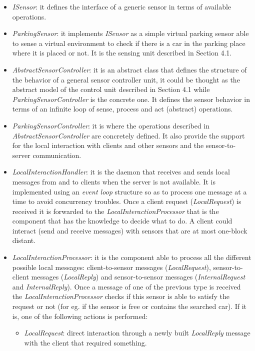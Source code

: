 \documentclass[11pt]{article}
\begin{document}
\begin{itemize}
\item \emph{ISensor}: it defines the interface of a generic sensor in terms of available operations.
\item \emph{ParkingSensor}: it implements \emph{ISensor} as a simple virtual parking sensor able to sense a virtual environment to check if there is a car in the parking place where it is placed or not. It is the sensing unit described in Section 4.1.
\item \emph{AbstractSensorController}: it is an abstract class that defines the structure of the behavior of a general sensor controller unit, it could be thought as the abstract model of the control unit described in Section 4.1 while \emph{ParkingSensorController} is the concrete one. It defines the sensor behavior in terms of an infinite loop of sense, process and act (abstract) operations.
\item \emph{ParkingSensorController}: it is where the operations described in \emph{AbstractSensorController} are concretely defined. It also provide the support for the local interaction with clients and other sensors and the sensor-to-server communication.
\item \emph{LocalInteractionHandler}: it is the daemon that receives and sends local messages from and to clients when the server is not available. It is implemented using an \emph{event loop} structure so as to process one message at a time to avoid concurrency troubles. Once a client request (\emph{LocalRequest}) is received it is forwarded to the \emph{LocalInteractionProcessor} that is the component that has the knowledge to decide what to do. A client could interact (send and receive messages) with sensors that are at most one-block distant.
\item \emph{LocalInteractionProcessor}: it is the component able to process all the different possible local messages: client-to-sensor messages (\emph{LocalRequest}), sensor-to-client messages (\emph{LocalReply}) and sensor-to-sensor messages (\emph{InternalRequest} and \emph{InternalReply}). Once a message of one of the previous type is received the \emph{LocalInteractionProcessor} checks if this sensor is able to satisfy the request or not (for eg. if the sensor is free or contains the searched car). If it is, one of the following actions is performed:
\begin{itemize}
\item \emph{LocalRequest}: direct interaction through a newly built \emph{LocalReply} message with the client that required something.

\end{itemize}
\end{itemize}
\end{document}
